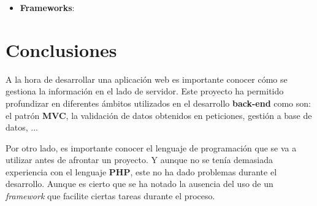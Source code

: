 \documentclass{\ClassPath/viu-tfm-template}
\begin{document}
\vspace{-1em}
\begin{itemize}
    \item \textbf{Frameworks}:
\end{itemize}


\chapter{Conclusiones}

A la hora de desarrollar una aplicación web es importante conocer cómo se gestiona la información en el lado de servidor. Este proyecto ha permitido profundizar en diferentes ámbitos utilizados en el desarrollo \textbf{back-end} como son: el patrón \textbf{MVC}, la validación de datos obtenidos en peticiones, gestión a base de datos, ...

Por otro lado, es importante conocer el lenguaje de programación que se va a utilizar antes de afrontar un proyecto. Y aunque no se tenía demasiada experiencia con el lenguaje \textbf{PHP}, este no ha dado problemas durante el desarrollo. Aunque es cierto que se ha notado la ausencia del uso de un \textit{framework} que facilite ciertas tareas durante el proceso.
\end{document}
